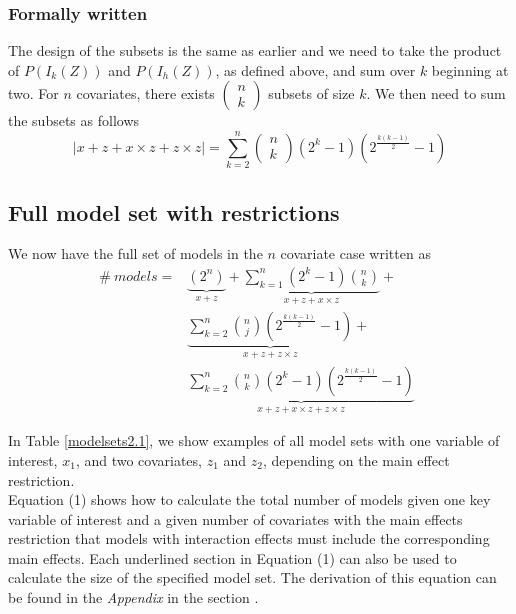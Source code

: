 \subsubsection{Formally written}
The design of the subsets is the same as earlier and we need to take the product of
$P\left(I_k\left(Z\right)\right)$ and $P\left(I_h\left(Z\right)\right)$, as defined above, and sum over $k$ beginning at two.
For $n$ covariates, there exists $\left( \begin{array}{c}
n \\ 
k \end{array}
\right)$ subsets of size $k$. We then need to sum the subsets as follows
\[|x + z + x \times z+z \times z|=\sum^n_{k=2}{\left( \begin{array}{c}
n \\ 
k \end{array}
\right)\left(2^k-1\right)\left(2^{\frac{k\left(k-1\right)}{2}}-1\right)}\] 

\subsection{Full model set with restrictions}
We now have the full set of models in the $n$ covariate case written as
\begin{equation} 
\begin{aligned}
\#\ models={} & \underbrace{\left(2^n\right)}_{x + z}+\underbrace{\sum^n_{k=1}{\left(2^k-1\right)\binom{n}{k}}}_{x + z + x \times z} + \\ 
& \underbrace{\sum^n_{k=2}{\binom{n}{j}\left(2^{\frac{k\left(k-1\right)}{2}}-1\right)}}_{x + z + z \times z} + \\
& \underbrace{\sum^n_{k=2}{\binom{n}{k}\left(2^k-1\right)\left(2^{\frac{k\left(k-1\right)}{2}}-1\right)}}_{x + z + x \times z + z \times z}\ \  
\end{aligned}
\end{equation} 


In Table \ref{modelsets2.1}, we show examples of all model sets with one variable of interest, $x_{1}$, and two covariates, $z_{1}$ and $z_{2}$, depending on the main effect restriction. \\
 


Equation (1) shows how to calculate the total number of models given one key variable of interest and a given number of covariates with the main effects restriction that models with interaction effects must include the corresponding main effects. Each underlined section in Equation (1) can also be used to calculate the size of the specified model set. The derivation of this equation can be found in the \textit{Appendix} in the section . \\

